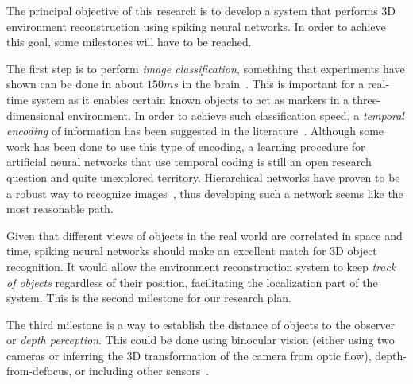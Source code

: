 The principal objective of this research is to develop a system that performs 3D environment reconstruction using spiking neural networks. In order to achieve this goal, some milestones will have to be reached. 

The first step is to perform \emph{image classification}, something that experiments have shown can be done in about $150ms$ in the brain~\cite{Thorpe1996-speed-of-processing}. This is important for a real-time system as it enables certain known objects to act as markers in a three-dimensional environment. In order to achieve such classification speed, a \emph{temporal encoding} of information has been suggested in the literature~\cite{VanRullen2005-spike-times}. Although some work has been done to use this type of encoding, a learning procedure for artificial neural networks that use temporal coding is still an open research question and quite unexplored territory. Hierarchical networks have proven to be a robust way to recognize images~\cite{Behnke2003-hierachical-interpretation,Bengio2009-deep-architectures}, thus developing such a network seems like the most reasonable path. 

Given that different views of objects in the real world are correlated in space and time, spiking neural networks should make an excellent match for 3D object recognition. It would allow the environment reconstruction system to keep \emph{track of objects} regardless of their position, facilitating the localization part of the system. This is the second milestone for our research plan. %

The third milestone is a way to establish the distance of objects to the observer or \emph{depth perception}. This could be done using binocular vision (either using two cameras or inferring the 3D transformation of the camera from optic flow), depth-from-defocus, or including other sensors~\cite{depth-from-binocular-defocus-vs,event-slam,tomasi1992shape}. 

